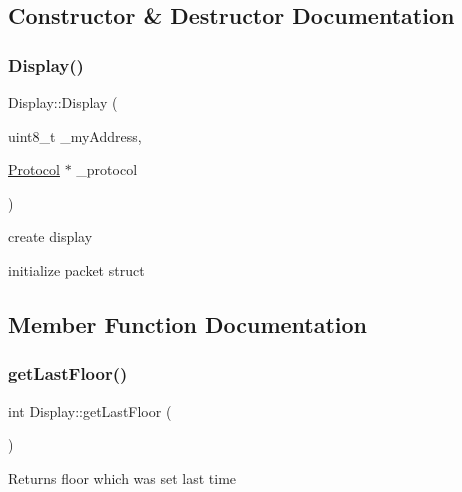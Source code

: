 \subsection{Constructor \& Destructor Documentation}
\mbox{\label{classDisplay_a66f71cdfe11b39d5b53137675905d170}} 
\subsubsection{\texorpdfstring{Display()}{Display()}}
{\footnotesize\ttfamily Display\+::\+Display (\begin{DoxyParamCaption}\item[{uint8\+\_\+t}]{\+\_\+my\+Address,  }\item[{\hyperlink{classProtocol}{Protocol} $\ast$}]{\+\_\+protocol }\end{DoxyParamCaption})\hspace{0.3cm}{\ttfamily [inline]}}



create display 

initialize packet struct 

\subsection{Member Function Documentation}
\mbox{\label{classDisplay_a5b98e4001a790074ca7ef6ae93dae63d}} 
\subsubsection{\texorpdfstring{get\+Last\+Floor()}{getLastFloor()}}
{\footnotesize\ttfamily int Display\+::get\+Last\+Floor (\begin{DoxyParamCaption}{ }\end{DoxyParamCaption})}

\begin{DoxyReturn}{Returns}
floor which was set last time 
\end{DoxyReturn}
\mbox{\label{classDisplay_a6244d2fcce88bb8880f3348fcaba5e77}} 
